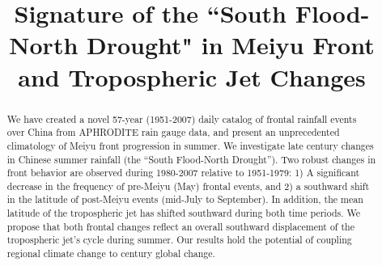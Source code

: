 \documentclass[draft,grl]{AGUTeX}
\begin{document}
%
%


\title{Signature of the ``South Flood-North Drought" in Meiyu Front and Tropospheric Jet Changes}

%
%







%
%


\begin{abstract}
We have created a novel 57-year (1951-2007) daily catalog of frontal rainfall events over China from APHRODITE rain gauge data, and present an unprecedented climatology of Meiyu front progression in summer. We investigate late  century changes in Chinese summer rainfall (the ``South Flood-North Drought''). Two robust changes in front behavior are observed during 1980-2007 relative to 1951-1979: 1) A significant decrease in the frequency of pre-Meiyu (May) frontal events, and 2) a southward shift in the latitude of post-Meiyu events (mid-July to September). In addition, the mean latitude of the tropospheric jet has shifted southward during both time periods. We propose that both frontal changes reflect an overall southward displacement of the tropospheric jet's cycle during summer. Our results hold the potential of coupling regional climate change to  century global change. 

\end{abstract}
\end{document}
